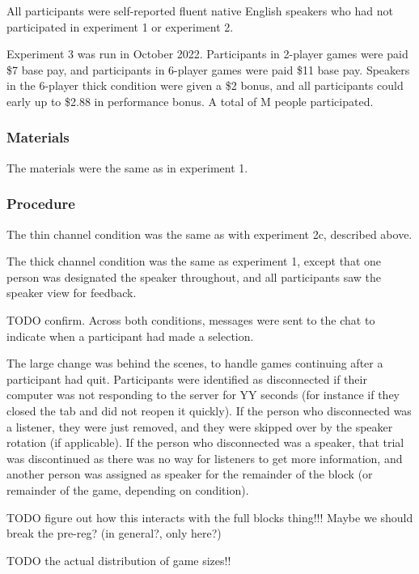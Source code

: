 \documentclass[
  english,
  a4paper,
]{article}
\begin{document}
All participants were self-reported fluent native English speakers who had not participated in experiment 1 or experiment 2.

Experiment 3 was run in October 2022. Participants in 2-player games were paid \$7 base pay, and participants in 6-player games were paid \$11 base pay. Speakers in the 6-player thick condition were given a \$2 bonus, and all participants could early up to \$2.88 in performance bonus. A total of M people participated.

\hypertarget{materials-2}{%
\subsubsection{Materials}\label{materials-2}}

The materials were the same as in experiment 1.

\hypertarget{procedure-2}{%
\subsubsection{Procedure}\label{procedure-2}}

The thin channel condition was the same as with experiment 2c, described above.

The thick channel condition was the same as experiment 1, except that one person was designated the speaker throughout, and all participants saw the speaker view for feedback.

TODO confirm. Across both conditions, messages were sent to the chat to indicate when a participant had made a selection.

The large change was behind the scenes, to handle games continuing after a participant had quit. Participants were identified as disconnected if their computer was not responding to the server for YY seconds (for instance if they closed the tab and did not reopen it quickly). If the person who disconnected was a listener, they were just removed, and they were skipped over by the speaker rotation (if applicable). If the person who disconnected was a speaker, that trial was discontinued as there was no way for listeners to get more information, and another person was assigned as speaker for the remainder of the block (or remainder of the game, depending on condition).

TODO figure out how this interacts with the full blocks thing!!! Maybe we should break the pre-reg? (in general?, only here?)

TODO the actual distribution of game sizes!!
\end{document}
